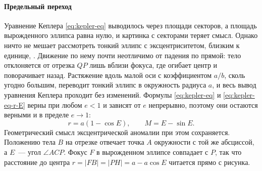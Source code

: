 \paragraph{Предельный переход} Уравнение Кеплера \eqref{eq:kepler-eq} выводилось через площади секторов, а площадь вырожденного эллипса равна нулю, и картинка с секторами теряет смысл. Однако ничто не мешает рассмотреть тонкий эллипс с эксцентриситетом, близким к единице, . Движение по нему почти неотличимо от падения по прямой: тело отклоняется от отрезка $QP$ лишь вблизи фокуса, где огибает центр и поворачивает назад. Растяжение вдоль малой оси с коэффициентом $a / b$, сколь угодно большим, переводит тонкий эллипс в окружность радиуса $a$, и весь вывод уравнения Кеплера проходит без изменений. Формулы \eqref{eq:kepler-eq} и \eqref{eq:kepler-eq-r-E} верны при любом $e < 1$ и зависят от $e$ непрерывно, поэтому они остаются верными и в пределе $e \to 1$:
\begin{equation}
    r = a (1 - \cos E),
    \qquad
    M = E - \sin E.
    \label{eq:kepler-eq-degenerate}
\end{equation}
Геометрический смысл эксцентрической аномалии при этом сохраняется. Положению тела $B$ на отрезке отвечает точка $A$ окружности с той же абсциссой, а $E$~--- угол $\angle ACP$. Фокус $F$ в вырожденном эллипсе совпадает с $P$, так что расстояние до центра $r = |FB| = |PH| = a - a \cos E$ читается прямо с рисунка.

